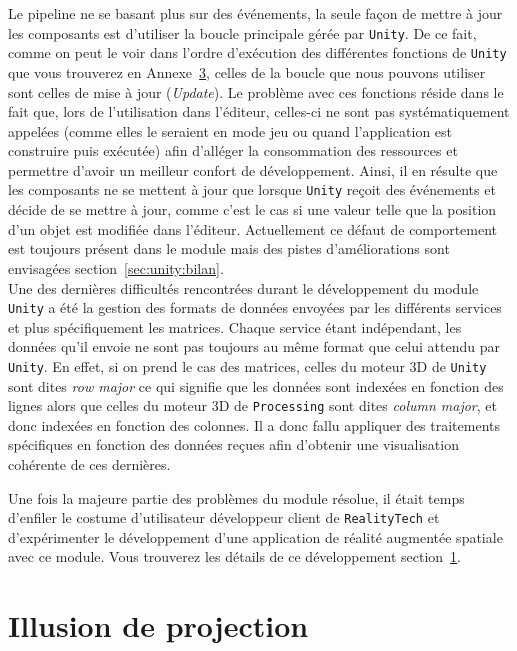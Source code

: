 Le pipeline ne se basant plus sur des événements, la seule façon de mettre à jour les composants est d'utiliser la boucle principale gérée par \texttt{Unity}. De ce fait, comme on peut le voir dans l'ordre d'exécution des différentes fonctions de \texttt{Unity} que vous trouverez en Annexe~\hyperref[annexe:unity]{3}, celles de la boucle que nous pouvons utiliser sont celles de mise à jour (\emph{Update}). Le problème avec ces fonctions réside dans le fait que, lors de l'utilisation dans l'éditeur, celles-ci ne sont pas systématiquement appelées (comme elles le seraient en mode jeu ou quand l'application est construire puis exécutée) afin d'alléger la consommation des ressources et permettre d'avoir un meilleur confort de développement. Ainsi, il en résulte que les composants ne se mettent à jour que lorsque \texttt{Unity} reçoit des événements et décide de se mettre à jour, comme c'est le cas si une valeur telle que la position d'un objet est modifiée dans l'éditeur. Actuellement ce défaut de comportement est toujours présent dans le module mais des pistes d'améliorations sont envisagées section~\ref{sec:unity:bilan}.\\

Une des dernières difficultés rencontrées durant le développement du module \texttt{Unity} a été la gestion des formats de données envoyées par les différents services et plus spécifiquement les matrices. Chaque service étant indépendant, les données qu'il envoie ne sont pas toujours au même format que celui attendu par \texttt{Unity}. En effet, si on prend le cas des matrices, celles du moteur 3D de \texttt{Unity} sont dites \emph{row major} ce qui signifie que les données sont indexées en fonction des lignes alors que celles du moteur 3D de \texttt{Processing} sont dites \emph{column major}, et donc indexées en fonction des colonnes. Il a donc fallu appliquer des traitements spécifiques en fonction des données reçues afin d'obtenir une visualisation cohérente de ces dernières.

Une fois la majeure partie des problèmes du module résolue, il était temps d'enfiler le costume d'utilisateur développeur client de \texttt{RealityTech} et d'expérimenter le développement d'une application de réalité augmentée spatiale avec ce module. Vous trouverez les détails de ce développement section~\ref{sec:unity:appli}.

\section{Illusion de projection}
\label{sec:unity:appli}

